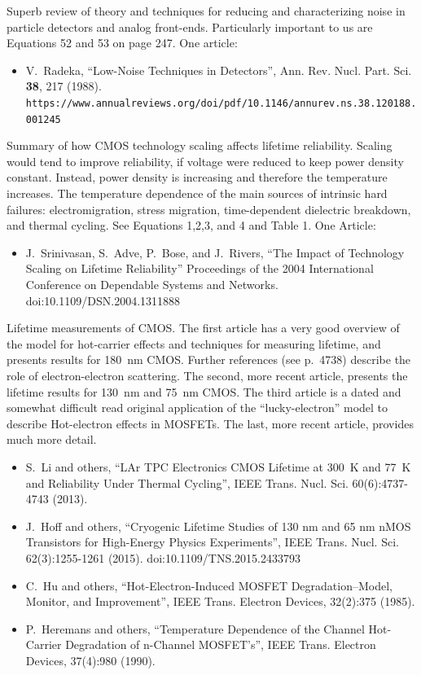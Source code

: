 \documentclass[12pt]{article}
\begin{document}
\begin{thebibliography}{1}
%
%

Superb review of theory and techniques for reducing and characterizing noise in particle detectors and analog front-ends.  Particularly important to us are Equations 52 and 53 on page 247.  One article:
\begin{itemize}
\item V.~Radeka, ``Low-Noise Techniques in Detectors'', Ann. Rev. Nucl. Part. Sci. {\bf 38}, 217 (1988).
{\tt https://www.annualreviews.org/doi/pdf/10.1146/annurev.ns.38.120188.001245}
\end{itemize}

%
%

Summary of how CMOS technology scaling affects lifetime reliability.  Scaling would tend to improve reliability, if voltage were reduced to keep power density constant.  Instead, power density is increasing and therefore the temperature increases.  The temperature dependence of the main sources of intrinsic hard failures:  electromigration, stress migration, time-dependent dielectric breakdown, and thermal cycling.  See Equations 1,2,3, and 4 and Table 1.  One Article:
\begin{itemize}
\item J.~Srinivasan, S.~Adve, P.~Bose, and J.~Rivers, ``The Impact of Technology Scaling on Lifetime Reliability'' Proceedings of the 2004 International Conference on Dependable Systems and Networks.
doi:10.1109/DSN.2004.1311888\\
\end{itemize}

Lifetime measurements of CMOS.  The first article has a very good overview of the model for hot-carrier effects and techniques for measuring lifetime, and presents results for 180~nm CMOS.  Further references (see p.~4738) describe the role of electron-electron scattering.   The second, more recent article, presents the lifetime results for 130~nm and 75~\rm nm CMOS.  The third article is a dated and somewhat difficult read original application of the ``lucky-electron'' model to describe Hot-electron effects in MOSFETs.  The last, more recent article, provides much more detail.
\begin{itemize}
\item S.~Li and others, ``LAr TPC Electronics CMOS Lifetime at 300~K and 77~K and Reliability Under Thermal Cycling'', IEEE Trans. Nucl. Sci. 60(6):4737-4743 (2013).
\item J.~Hoff and others, ``Cryogenic Lifetime Studies of 130 nm and 65 nm nMOS Transistors for High-Energy Physics Experiments'', IEEE Trans. Nucl. Sci. 62(3):1255-1261 (2015).
doi:10.1109/TNS.2015.2433793 
\item C.~Hu and others, ``Hot-Electron-Induced MOSFET Degradation--Model, Monitor, and Improvement'', 
IEEE Trans. Electron Devices, 32(2):375 (1985).  
\item P.~Heremans and others, ``Temperature Dependence of the Channel Hot-Carrier Degradation of n-Channel MOSFET's'', IEEE Trans. Electron Devices, 37(4):980 (1990).
\end{itemize}


\end{thebibliography}
\end{document}
